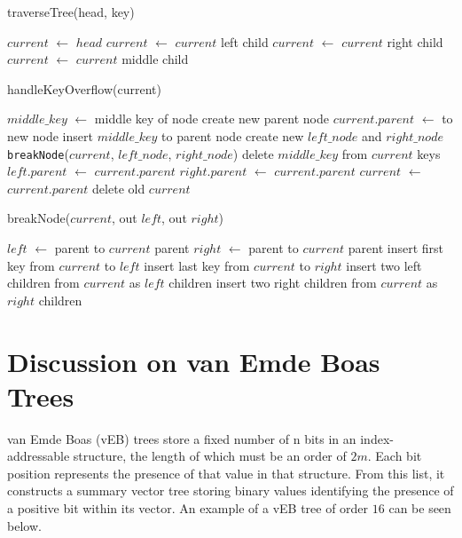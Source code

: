 \documentclass{article}
\begin{document}
\begin{function}
	\caption{traverseTree(head, key)}
	\DontPrintSemicolon
	$current$ $\gets$ $head$\;
	{
		{
			$current$ $\gets$ $current$ left child\;
		}
		{
			$current$ $\gets$ $current$ right child\;
		}
		\Else
		{
			$current$ $\gets$ $current$ middle child\;
		}
	}
\end{function}

\begin{function}
	\caption{handleKeyOverflow(current)}
	\DontPrintSemicolon
	{
		$middle\_key$ $\gets$ middle key of node\;
		{
			create new parent node\;
			$current.parent$ $\gets$ to new node\;
		}
		insert $middle\_key$ to parent node\;
		create new $left\_node$ and $right\_node$\;
		\texttt{breakNode}($current$, $left\_node$, $right\_node$)\;
		delete $middle\_key$ from $current$ keys\;
		$left.parent$ $\gets$ $current.parent$\;
		$right.parent$ $\gets$ $current.parent$\;
		$current$ $\gets$ $current.parent$\;
		delete old $current$\;
	}
\end{function}

\begin{function}
	\caption{breakNode($current$, out $left$, out $right$)}
	\DontPrintSemicolon
	$left$ $\gets$ parent to $current$ parent\;
	$right$ $\gets$ parent to $current$ parent\;
	insert first key from $current$ to $left$\;
	insert last key from $current$ to $right$\;
	{
		insert two left children from $current$ as $left$ children\;
		insert two right children from $current$ as $right$ children\;
	}
\end{function}

\pagebreak

\section*{Discussion on van Emde Boas Trees}

van Emde Boas (vEB) trees store a fixed number of n bits in an index-addressable structure, the length of which must be an order of $2m$. Each bit position represents the presence of that value in that structure. From this list, it constructs a summary vector tree storing binary values identifying the presence of a positive bit within its vector. An example of a vEB tree of order $16$ can be seen below.
\end{document}
